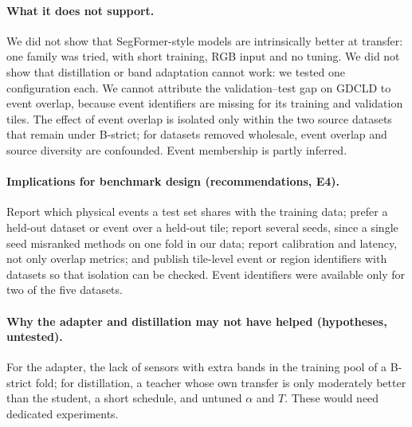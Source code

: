 \documentclass[11pt]{article}
\begin{document}
\paragraph{What it does not support.} We did not show that SegFormer-style models are intrinsically better at transfer: one family was tried, with short training, RGB input and no tuning. We did not show that distillation or band adaptation cannot work: we tested one configuration each. We cannot attribute the validation--test gap on GDCLD to event overlap, because event identifiers are missing for its training and validation tiles. The effect of event overlap is isolated only within the two source datasets that remain under B-strict; for datasets removed wholesale, event overlap and source diversity are confounded. Event membership is partly inferred.

\paragraph{Implications for benchmark design (recommendations, E4).} Report which physical events a test set shares with the training data; prefer a held-out dataset or event over a held-out tile; report several seeds, since a single seed misranked methods on one fold in our data; report calibration and latency, not only overlap metrics; and publish tile-level event or region identifiers with datasets so that isolation can be checked. Event identifiers were available only for two of the five datasets.

\paragraph{Why the adapter and distillation may not have helped (hypotheses, untested).} For the adapter, the lack of sensors with extra bands in the training pool of a B-strict fold; for distillation, a teacher whose own transfer is only moderately better than the student, a short schedule, and untuned $\alpha$ and $T$. These would need dedicated experiments.
\end{document}
